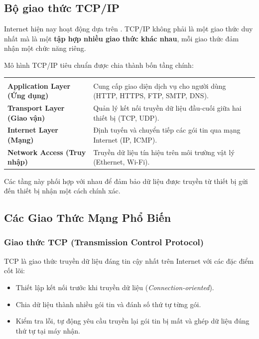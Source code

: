\subsection{Bộ giao thức TCP/IP}

Internet hiện nay hoạt động dựa trên . TCP/IP không phải là một giao thức duy nhất mà là một \textbf{tập hợp nhiều giao thức khác nhau}, mỗi giao thức đảm nhận một chức năng riêng.

Mô hình TCP/IP tiêu chuẩn được chia thành bốn tầng chính:

\begin{prettyTableBox}
\begin{tabularx}{\linewidth}{>{\bfseries\color{primaryBlue}}C{3.8cm} Z}
 &  \\
Application Layer (Ứng dụng) & Cung cấp giao diện dịch vụ cho người dùng (HTTP, HTTPS, FTP, SMTP, DNS). \\
Transport Layer (Giao vận) & Quản lý kết nối truyền dữ liệu đầu-cuối giữa hai thiết bị (TCP, UDP). \\
Internet Layer (Mạng) & Định tuyến và chuyển tiếp các gói tin qua mạng Internet (IP, ICMP). \\
Network Access (Truy nhập) & Truyền dữ liệu tín hiệu trên môi trường vật lý (Ethernet, Wi-Fi). \\
\end{tabularx}
\end{prettyTableBox}

Các tầng này phối hợp với nhau để đảm bảo dữ liệu được truyền từ thiết bị gửi đến thiết bị nhận một cách chính xác.

\subsection{Các Giao Thức Mạng Phổ Biến}

\subsubsection{Giao thức TCP (Transmission Control Protocol)}

TCP là giao thức truyền dữ liệu đáng tin cậy nhất trên Internet với các đặc điểm cốt lõi:
\begin{itemize}[leftmargin=1.8em, itemsep=2pt, parsep=0pt]
    \item Thiết lập kết nối trước khi truyền dữ liệu (\textit{Connection-oriented}).
    \item Chia dữ liệu thành nhiều gói tin và đánh số thứ tự từng gói.
    \item Kiểm tra lỗi, tự động yêu cầu truyền lại gói tin bị mất và ghép dữ liệu đúng thứ tự tại máy nhận.
\end{itemize}


